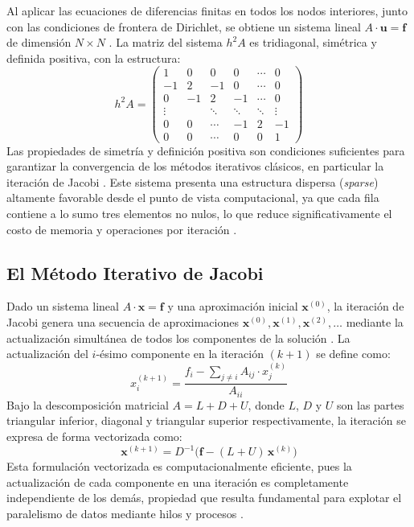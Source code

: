 Al aplicar las ecuaciones de diferencias finitas en todos los nodos interiores, junto con
las condiciones de frontera de Dirichlet, se obtiene un sistema lineal
$A \cdot \mathbf{u} = \mathbf{f}$ de dimensión $N \times N$ \parencite{burkardt2011jacobi}.
La matriz del sistema $h^2 A$ es tridiagonal, simétrica y definida positiva, con la
estructura:
\begin{equation}
    h^2 A =
    \begin{pmatrix}
        1  & 0  & 0  & 0  & \cdots & 0 \\
        -1 & 2  & -1 & 0  & \cdots & 0 \\
        0  & -1 & 2  & -1 & \cdots & 0 \\
        \vdots & & \ddots & \ddots & \ddots & \vdots \\
        0  & 0  & \cdots & -1 & 2  & -1 \\
        0  & 0  & \cdots & 0  & 0  & 1
    \end{pmatrix}
    \label{eq:matriz_tridiagonal}
\end{equation}
Las propiedades de simetría y definición positiva son condiciones suficientes para
garantizar la convergencia de los métodos iterativos clásicos, en particular la iteración
de Jacobi \parencite{burkardt2011jacobi}. Este sistema presenta una estructura dispersa
(\textit{sparse}) altamente favorable desde el punto de vista computacional, ya que cada
fila contiene a lo sumo tres elementos no nulos, lo que reduce significativamente el costo
de memoria y operaciones por iteración \parencite{barrett1994templates}.

\subsection{El Método Iterativo de Jacobi}

Dado un sistema lineal $A \cdot \mathbf{x} = \mathbf{f}$ y una aproximación inicial
$\mathbf{x}^{(0)}$, la iteración de Jacobi genera una secuencia de aproximaciones
$\mathbf{x}^{(0)}, \mathbf{x}^{(1)}, \mathbf{x}^{(2)}, \ldots$ mediante la actualización
simultánea de todos los componentes de la solución \parencite{burkardt2011jacobi}. La
actualización del $i$-ésimo componente en la iteración $(k+1)$ se define como:
\begin{equation}
    x_i^{(k+1)} = \frac{f_i - \displaystyle\sum_{j \neq i} A_{ij} \cdot x_j^{(k)}}{A_{ii}}
    \label{eq:jacobi_scalar}
\end{equation}
Bajo la descomposición matricial $A = L + D + U$, donde $L$, $D$ y $U$ son las partes
triangular inferior, diagonal y triangular superior respectivamente, la iteración se
expresa de forma vectorizada como:
\begin{equation}
    \mathbf{x}^{(k+1)} = D^{-1}\bigl(\mathbf{f} - (L + U)\,\mathbf{x}^{(k)}\bigr)
    \label{eq:jacobi_vectorized}
\end{equation}
Esta formulación vectorizada es computacionalmente eficiente, pues la actualización de
cada componente en una iteración es completamente independiente de los demás, propiedad
que resulta fundamental para explotar el paralelismo de datos mediante hilos y procesos
\parencite{burkardt2011jacobi}.

